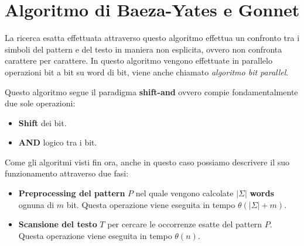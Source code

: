 \section{Algoritmo di Baeza-Yates e Gonnet}
La ricerca esatta effettuata attraverso questo algoritmo effettua un confronto
tra i simboli del pattern e del testo in maniera non esplicita, ovvero non confronta
carattere per carattere. In questo algoritmo vengono effettuate in parallelo operazioni
bit a bit su word di bit, viene anche chiamato \textit{algoritmo bit parallel}.

Questo algoritmo segue il paradigma \textbf{shift-and} ovvero compie fondamentalmente
due sole operazioni:
\begin{itemize}
    \item \textbf{Shift} dei bit.
    \item \textbf{AND} logico tra i bit.
\end{itemize}
Come gli algoritmi visti fin ora, anche in questo caso possiamo descrivere il suo
funzionamento attraverso due fasi:
\begin{itemize}
    \item \textbf{Preprocessing del pattern} $P$ nel quale vengono calcolate
          $|\Sigma|$ \textbf{words} ognuna di $m$ bit. Questa operazione viene eseguita
          in tempo $\theta(|\Sigma| + m)$.
    \item \textbf{Scansione del testo} $T$ per cercare le occorrenze esatte del
          pattern $P$. Questa operazione viene eseguita in tempo $\theta(n)$.
\end{itemize}
